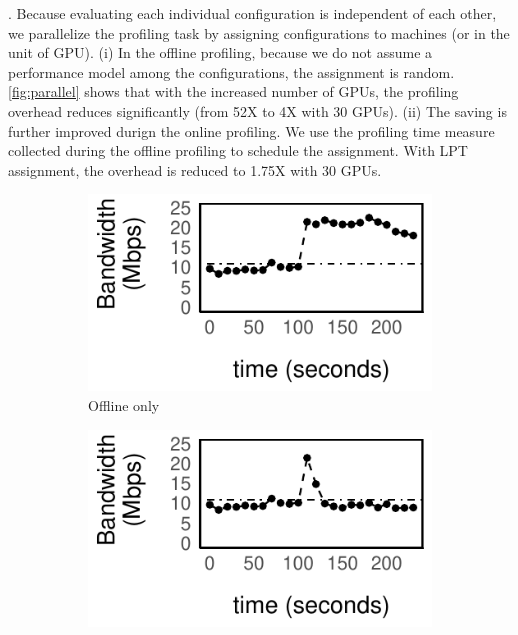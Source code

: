 . Because evaluating each
individual configuration is independent of each other, we parallelize the
profiling task by assigning configurations to machines (or in the unit of
GPU). (i) In the offline profiling, because we do not assume a performance model
among the configurations, the assignment is random. \autoref{fig:parallel} shows
that with the increased number of GPUs, the profiling overhead reduces
significantly (from 52X to 4X with 30 GPUs). (ii) The saving is further improved
durign the online profiling. We use the profiling time measure collected during
the offline profiling to schedule the assignment. With LPT assignment, the
overhead is reduced to 1.75X with 30 GPUs.

\begin{figure}
  \centering
  \begin{subfigure}[t]{0.48\columnwidth}
    \centering
    \includegraphics[width=\textwidth]{figures/online1.pdf}
    \caption{Offline only}
    \label{fig:offline}
  \end{subfigure}
  \hfill
  \begin{subfigure}[t]{0.48\columnwidth}
    \centering
    \includegraphics[width=\textwidth]{figures/online2.pdf}

\end{subfigure}
\end{figure}
